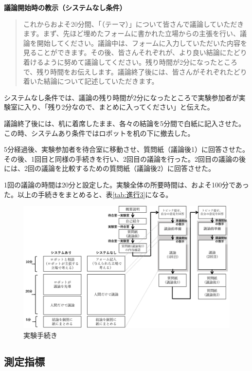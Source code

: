 \documentclass[11pt, a4paper]{jreport} %
\begin{document}
\textbf{議論開始時の教示（システムなし条件）}
\begin{quote}
これからおよそ20分間、「（テーマ）」について皆さんで議論していただきます。まず、先ほど埋めたフォームに書かれた立場からの主張を行い、議論を開始してください。議論中は、フォームに入力していただいた内容を見ることができます。その後、皆さんそれぞれが、より良い結論にたどり着けるように努めて議論してください。残り時間が2分になったところで、残り時間をお伝えします。議論終了後には、皆さんがそれぞれたどり着いた結論について記述していただきます。
\end{quote}
システムなし条件では、議論の残り時間が2分になったところで実験参加者が実験室に入り、「残り2分なので、まとめに入ってください」と伝えた。



議論終了後には、机に着席したまま、各々の結論を5分間で白紙に記入させた。この時、システムあり条件ではロボットを机の下に撤去した。

5分経過後、実験参加者を待合室に移動させ、質問紙（議論後1）に回答させた。その後、1回目と同様の手続きを行い、2回目の議論を行った。2回目の議論の後には、2回の議論を比較するための質問紙（議論後2）に回答させた。


1回の議論の時間は20分と設定した。実験全体の所要時間は、およそ100分であった。以上の手続きをまとめると、表\ref{tab:進行3}になる。


\begin{figure}[htbp]
\begin{center}
\includegraphics[width=150mm]{images/実験手続き.png}
\caption{実験手続き}
\label{fig:進行3}
\end{center}
\end{figure}


\subsection{測定指標}
\end{document}
